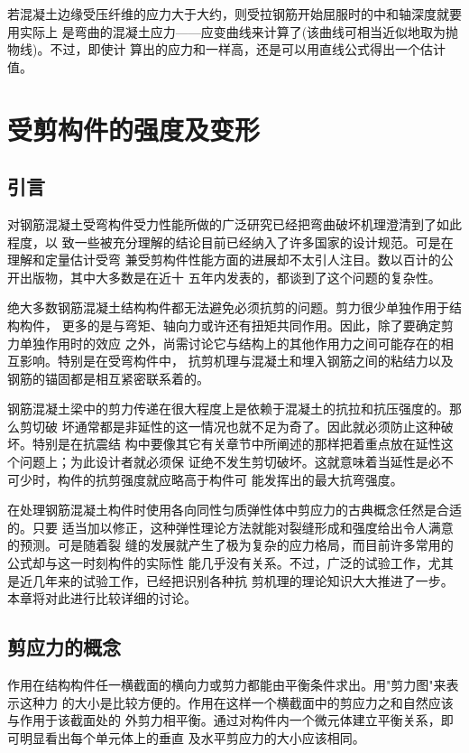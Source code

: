 \documentclass[12pt,a4paper]{book}
\begin{document}
若混凝土边缘受压纤维的应力大于大约，则受拉钢筋开始屈服时的中和轴深度就要用实际上
是弯曲的混凝土应力——应变曲线来计算了(该曲线可相当近似地取为抛物线)。不过，即使计
算出的应力和一样高，还是可以用直线公式得出一个估计值。






\chapter{受剪构件的强度及变形}

\section{引言}

对钢筋混凝土受弯构件受力性能所做的广泛研究已经把弯曲破坏机理澄清到了如此程度，以
致一些被充分理解的结论目前已经纳入了许多国家的设计规范。可是在理解和定量估计受弯
兼受剪构件性能方面的进展却不太引人注目。数以百计的公开出版物，其中大多数是在近十
五年内发表的，都谈到了这个问题的复杂性。

绝大多数钢筋混凝土结构构件都无法避免必须抗剪的问题。剪力很少单独作用于结构构件，
更多的是与弯矩、轴向力或许还有扭矩共同作用。因此，除了要确定剪力单独作用时的效应
之外，尚需讨论它与结构上的其他作用力之间可能存在的相互影响。特别是在受弯构件中，
抗剪机理与混凝土和埋入钢筋之间的粘结力以及钢筋的锚固都是相互紧密联系着的。

钢筋混凝土梁中的剪力传递在很大程度上是依赖于混凝土的抗拉和抗压强度的。那么剪切破
坏通常都是非延性的这一情况也就不足为奇了。因此就必须防止这种破坏。特别是在抗震结
构中要像其它有关章节中所阐述的那样把着重点放在延性这个问题上；为此设计者就必须保
证绝不发生剪切破坏。这就意味着当延性是必不可少时，构件的抗剪强度就应略高于构件可
能发挥出的最大抗弯强度。

在处理钢筋混凝土构件时使用各向同性匀质弹性体中剪应力的古典概念任然是合适的。只要
适当加以修正，这种弹性理论方法就能对裂缝形成和强度给出令人满意的预测。可是随着裂
缝的发展就产生了极为复杂的应力格局，而目前许多常用的公式却与这一时刻构件的实际性
能几乎没有关系。不过，广泛的试验工作，尤其是近几年来的试验工作，已经把识别各种抗
剪机理的理论知识大大推进了一步。本章将对此进行比较详细的讨论。

\section{剪应力的概念}

作用在结构构件任一横截面的横向力或剪力都能由平衡条件求出。用"剪力图"来表示这种力
的大小是比较方便的。作用在这样一个横截面中的剪应力之和自然应该与作用于该截面处的
外剪力相平衡。通过对构件内一个微元体建立平衡关系，即可明显看出每个单元体上的垂直
及水平剪应力的大小应该相同。
\end{document}
